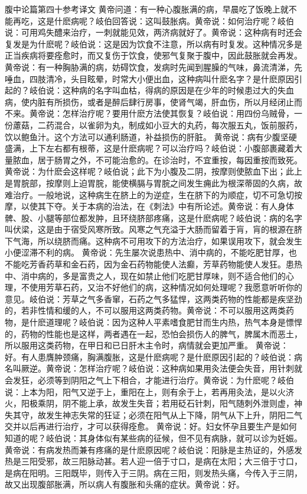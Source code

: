 \documentclass[a4paper,12pt,UTF8,twoside]{ctexbook}
\begin{document}
腹中论篇第四十参考译文
黄帝问道：有一种心腹胀满的病，早晨吃了饭晚上就不能再吃，这是什麽病呢？岐伯回答说：这叫鼓胀病。黄帝说：如何治疗呢？岐伯说：可用鸡失醴来治疗，一刺就能见效，两济病就好了。黄帝说：这种病有时还会复发是为什麽呢？岐伯说：这是因为饮食不注意，所以病有时复发。这种情况多是正当疾病将要痊愈时，而又复伤于饮食，使邪气复聚于腹中，因此鼓胀就会再发。
黄帝说：有一种胸胁满的病，妨碍饮食，发病时先闻到腥臊的气味，鼻流清涕，先唾血，四肢清冷，头目眩晕，时常大小便出血，这种病叫什麽名字？是什麽原因引起的？岐伯说：这种病的名字叫血枯，得病的原因是在少年的时候患过大的失血病，使内脏有所损伤，或者是醉后肆行房事，使肾气竭，肝血伤，所以月经闭止而不来。黄帝说：怎样治疗呢？要用什麽方法使其恢复？岐伯说：用四份乌贼骨，一份藘菇，二药混合，以雀卵为丸，制成如小豆大的丸药，每次服五丸，饭前服药，饮以鲍鱼汁。这个方法可以通利肠道，补益损伤的肝脏。
黄帝说：病有少腹坚硬盛满，上下左右都有根蒂，这是什麽病呢？可以治疗吗？岐伯说：小腹部裹藏着大量脓血，居于肠胃之外，不可能治愈的。在诊治时，不宜重按，每因重按而致死。黄帝说：为什麽会这样呢？岐伯说；此下为小腹及二阴，按摩则使脓血下出；此上是胃脘部，按摩则上迫胃脘，能使横膈与胃脘之间发生痈此为根深蒂固的久病，故难治疗。一般地说，这种病生在脐上的为逆症，生在脐下的为顺症，切不可急切按摩，以使其下夺。关于本病的治法，在《刺法》中有所论述。黄帝说：有人身体髀、股、小腿等部位都发肿，且环绕脐部疼痛，这是什麽病呢？岐伯说：病的名字叫伏梁，这是由于宿受风寒所致。风寒之气充溢于大肠而留着于肓，肓的根源在脐下气海，所以绕脐而痛。这种病不可用攻下的方法治疗，如果误用攻下，就会发生小便涩滞不利的病。
黄帝说：先生屡次说患热中、消中病的，不能吃肥甘厚，也不能吃芳香药草和金石药，因为金石药物能使人法癫，芳草药物能使人发狂。患热中、消中病的，多是富贵之人，现在如禁止他们吃肥甘厚味，则不适合他们的心理，不使用芳草石药，又治不好他们的病，这种情况如何处理呢？我愿意听听你的意见。岐伯说：芳草之气多香窜，石药之气多猛悍，这两类药物的性能都是疾坚劲的，若非性情和缓的人，不可以服用这两类药物。黄帝说：不可以服用这两类药物，是什麽道理呢？岐伯说：因为这种人平素嗜食肥甘而生内热，热气本身是慓悍的，药物的性能也是这样，两者遇在一起，恐怕会损伤人的脾气，脾属木而恶土，所以服用这类药物，在甲日和已日肝木主令时，病情就会更加严重。
黄帝说：好。有人患膺肿颈痛，胸满腹胀，这是什麽病呢？是什麽原因引起的？岐伯说：病名叫厥逆。黄帝说：怎样治疗呢？岐伯说：这种病如果用灸法便会失音，用针刺就会发狂，必须等到阴阳之气上下相合，才能进行治疗。黄帝说：为什麽呢？岐伯说：上本为阳，阳气又逆于上，重阳在上，则有余于上，若再用灸法，是以火济火，阳极乘阴，阴不能上承，故发生失音；若用砭石针刺，阳气随刺外泄则虚，神失其守，故发生神志失常的狂证；必须在阳气从上下降，阴气从下上升，阴阳二气交并以后再进行治疗，才可以获得痊愈。
黄帝说：好。妇女怀孕且要生产是如何知道的呢？岐伯说：其身体似有某些病的征候，但不见有病脉，就可以诊为妊娠。
黄帝说：有病发热而兼有疼痛的是什麽原因呢？岐伯说：阳脉是主热证的，外感发热是三阳受邪，故三阳脉动甚。若人迎一倍于寸口，是病在太阳；大三倍于寸口，是病在阳明。三阳既毕，则传入于三阴。病在三阳，则发热头痛，今传入于三阴，故又出现腹部胀满，所以病人有腹胀和头痛的症状。黄帝说：好。
\end{document}

